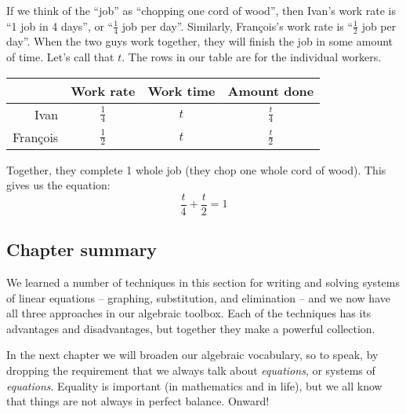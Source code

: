 If we think of the ``job'' as ``chopping one cord of wood'', then Ivan's work rate is ``1 job in 4 days'', or ``$\frac{1}{4}$ job per day''. Similarly, Fran\c{c}ois's work rate is ``$\frac{1}{2}$ job per day''. When the two guys work together, they will finish the job in some amount of time. Let's call that $t$. The rows in our table are for the individual workers.

\begin{center}
\begin{tabular}{r|ccc}
				& Work rate				& Work time			& Amount done\\\hline
Ivan				& $\frac{1}{4}$			& $t$					& $\frac{t}{4}$\\
Fran\c{c}ois		& $\frac{1}{2}$			& $t$					& $\frac{t}{2}$\\
\end{tabular}
\end{center}

Together, they complete 1 whole job (they chop one whole cord of wood). This gives us the equation:
\[
\frac{t}{4} + \frac{t}{2} = 1
\]

\subsection*{Chapter summary}

We learned a number of techniques in this section for writing and solving systems of linear equations -- graphing, substitution, and elimination -- and we now have all three approaches in our algebraic toolbox. Each of the techniques has its advantages and disadvantages, but together they make a powerful collection.

In the next chapter we will broaden our algebraic vocabulary, so to speak, by dropping the requirement that we always talk about \textit{equations}, or systems of \textit{equations}. Equality is important (in mathematics and in life), but we all know that things are not always in perfect balance. Onward!
